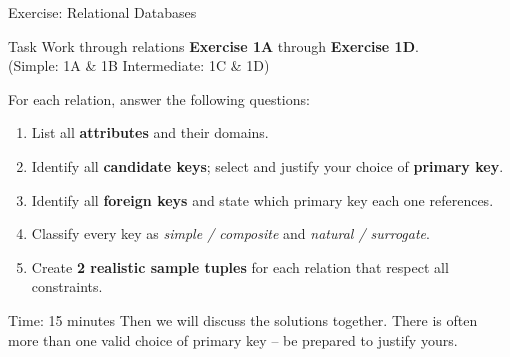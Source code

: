 \begin{frame}{Exercise: Relational Databases}
  \begin{block}{Task}
    Work through relations \textbf{Exercise 1A} through \textbf{Exercise 1D}.\\
    (Simple: 1A \& 1B \quad Intermediate: 1C \& 1D)
  \end{block}

  For each relation, answer the following questions:

  \begin{enumerate}
    \item List all \textbf{attributes} and their domains.
    \item Identify all \textbf{candidate keys}; select and justify your choice of
          \textbf{primary key}.
    \item Identify all \textbf{foreign keys} and state which primary key each
          one references.
    \item Classify every key as
          \emph{simple / composite} and \emph{natural / surrogate}.
    \item Create \textbf{2 realistic sample tuples} for each relation that
          respect all constraints.
  \end{enumerate}

  \begin{alertblock}{Time: 15 minutes}
    Then we will discuss the solutions together.  There is often more than one
    valid choice of primary key -- be prepared to justify yours.
  \end{alertblock}
\end{frame}

